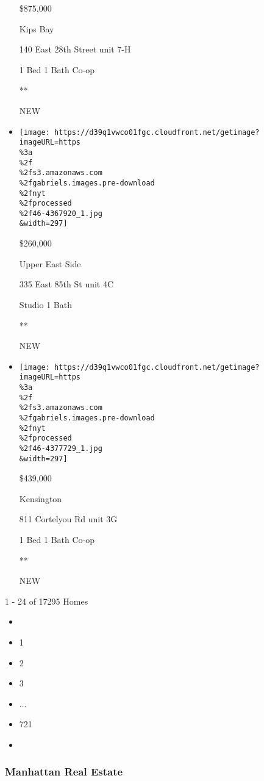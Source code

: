 \begin{itemize}
  \$875,000

  Kips Bay

  140 East 28th Street unit 7-H

  1 Bed \textbar{} 1 Bath \textbar{} Co-op

  **

  NEW
\item
  \href{/real-estate/usa/ny/new-york/upper-east-side/homes-for-sale/335-east-85th-st/46-4367920?}{}

  \texttt{[image: https://d39q1vwco01fgc.cloudfront.net/getimage?imageURL=https\\\%3a\\\%2f\\\%2fs3.amazonaws.com\\\%2fgabriels.images.pre-download\\\%2fnyt\\\%2fprocessed\\\%2f46-4367920\_1.jpg\\\&width=297]}

  \$260,000

  Upper East Side

  335 East 85th St unit 4C

  Studio \textbar{} 1 Bath \textbar{}

  **

  NEW
\item
  \href{/real-estate/usa/ny/brooklyn/kensington/homes-for-sale/811-cortelyou-rd/46-4377729?}{}

  \texttt{[image: https://d39q1vwco01fgc.cloudfront.net/getimage?imageURL=https\\\%3a\\\%2f\\\%2fs3.amazonaws.com\\\%2fgabriels.images.pre-download\\\%2fnyt\\\%2fprocessed\\\%2f46-4377729\_1.jpg\\\&width=297]}

  \$439,000

  Kensington

  811 Cortelyou Rd unit 3G

  1 Bed \textbar{} 1 Bath \textbar{} Co-op

  **

  NEW
\end{itemize}

1 - 24 of 17295 Homes

\begin{itemize}
\item
\item
  1
\item
  2
\item
  3
\item
  ...
\item
  721
\item
\end{itemize}

\hypertarget{manhattan-real-estate}{%
\subsubsection{Manhattan Real Estate}\label{manhattan-real-estate}}

